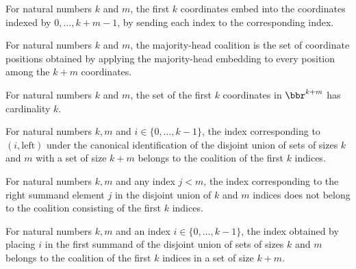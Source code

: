 \begin{definition}
\label{FABL.majorityHeadEmbedding}
\leanok
For natural numbers $k$ and $m$, the first $k$ coordinates embed into the coordinates
indexed by $0,\ldots,k+m-1$, by sending each index to the corresponding index.
\end{definition}

\begin{definition}
\label{FABL.majorityHeadCoalition}
\leanok
{}
For natural numbers $k$ and $m$, the majority-head coalition is the set of coordinate
positions obtained by applying the majority-head embedding to every position among the
$k+m$ coordinates.
\end{definition}

\begin{theorem}
\label{FABL.card_majorityHeadCoalition}
\leanok
{}
For natural numbers $k$ and $m$, the set of the first $k$ coordinates in $\bbr^{k+m}$ has
cardinality $k$.
\end{theorem}

\begin{theorem}
\label{FABL.mem_majorityHeadCoalition_left}
\leanok
{}
For natural numbers $k,m$ and $i\in\{0,\ldots,k-1\}$, the index corresponding to
$(i,\mathrm{left})$ under the canonical identification of the disjoint union of sets of
sizes $k$ and $m$ with a set of size $k+m$ belongs to the coalition of the first $k$
indices.
\end{theorem}

\begin{theorem}
\label{FABL.not_mem_majorityHeadCoalition_right}
\leanok
{}
For natural numbers $k,m$ and any index $j<m$, the index corresponding to the right
summand element $j$ in the disjoint union of $k$ and $m$ indices does not belong to the
coalition consisting of the first $k$ indices.
\end{theorem}

\begin{theorem}
\label{FABL.mem_majorityHeadCoalition_castAdd}
\leanok
{}
For natural numbers $k,m$ and an index $i\in\{0,\ldots,k-1\}$, the index obtained by
placing $i$ in the first summand of the disjoint union of sets of sizes $k$ and $m$
belongs to the coalition of the first $k$ indices in a set of size $k+m$.
\end{theorem}

